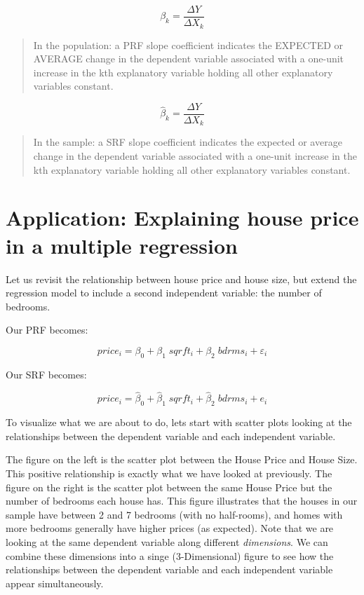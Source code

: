 \documentclass[
]{book}
\begin{document}
\[\beta_k=\frac{\Delta Y}{\Delta X_{k}}\]

\begin{quote}
In the population: a PRF slope coefficient indicates the EXPECTED or AVERAGE change in the dependent variable associated with a one-unit increase in the kth explanatory variable holding all other explanatory variables constant.
\end{quote}

\[\hat{\beta}_k=\frac{\Delta Y}{\Delta X_{k}}\]

\begin{quote}
In the sample: a SRF slope coefficient indicates the expected or average change in the dependent variable associated with a one-unit increase in the kth explanatory variable holding all other explanatory variables constant.
\end{quote}

\hypertarget{application-explaining-house-price-in-a-multiple-regression}{%
\section{Application: Explaining house price in a multiple regression}\label{application-explaining-house-price-in-a-multiple-regression}}

Let us revisit the relationship between house price and house size, but extend the regression model to include a second independent variable: the number of bedrooms.

Our PRF becomes:

\[price_i=\beta_0+\beta_1 \;sqrft_i+\beta_2 \;bdrms_i+\varepsilon_i\]

Our SRF becomes:

\[price_i=\hat{\beta}_0+\hat{\beta}_1 \;sqrft_i+\hat{\beta}_2 \;bdrms_i+e_i\]

To visualize what we are about to do, lets start with scatter plots looking at the relationships between the dependent variable and each independent variable.

The figure on the left is the scatter plot between the House Price and House Size. This positive relationship is exactly what we have looked at previously. The figure on the right is the scatter plot between the same House Price but the number of bedrooms each house has. This figure illustrates that the houses in our sample have between 2 and 7 bedrooms (with no half-rooms), and homes with more bedrooms generally have higher prices (as expected). Note that we are looking at the same dependent variable along different \emph{dimensions}. We can combine these dimensions into a singe (3-Dimensional) figure to see how the relationships between the dependent variable and each independent variable appear simultaneously.
\end{document}
